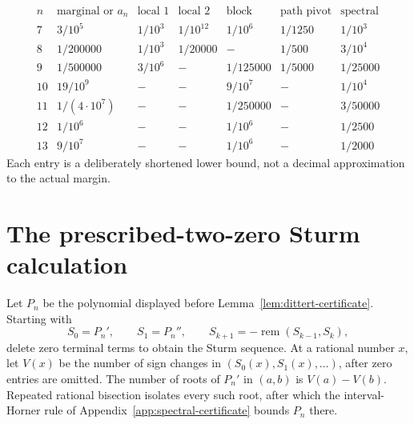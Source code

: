 \documentclass[11pt]{amsart}
\theoremstyle{definition}
\theoremstyle{remark}
\newenvironment{exacttable}
  {\begingroup\small
   \setlength{\arraycolsep}{4pt}%
   \renewcommand{\arraystretch}{1.12}}
  {\endgroup}
\begin{document}
\begin{exacttable}
\[
\begin{array}{c|c|c|c|c|c|c}
n&\text{marginal or }a_n&\text{local 1}&\text{local 2}
 &\text{block}&\text{path pivot}&\text{spectral}\\ \hline
7&3/10^5&1/10^3&1/10^{12}&1/10^6&1/1250&1/10^3\\
8&1/200000&1/10^3&1/20000&-&1/500&3/10^4\\
9&1/500000&3/10^6&-&1/125000&1/5000&1/25000\\
10&19/10^9&-&-&9/10^7&-&1/10^4\\
11&1/(4\cdot10^7)&-&-&1/250000&-&3/50000\\
12&1/10^6&-&-&1/10^6&-&1/2500\\
13&9/10^7&-&-&1/10^6&-&1/2000
\end{array}
\tag{A.1}
\]
\end{exacttable}
Each entry is a deliberately shortened lower bound, not a decimal
approximation to the actual margin.

\section{The prescribed-two-zero Sturm calculation}
\label{app:sturm-certificate}

Let \(P_n\) be the polynomial displayed before
Lemma~\ref{lem:dittert-certificate}.  Starting with
\[
 S_0=P_n',\qquad S_1=P_n'',\qquad
 S_{k+1}=-\operatorname{rem}(S_{k-1},S_k),
\]
delete zero terminal terms to obtain the Sturm sequence.  At a rational
number \(x\), let \(V(x)\) be the number of sign changes in
\((S_0(x),S_1(x),\ldots)\), after zero entries are omitted.  The number of
roots of \(P_n'\) in \((a,b)\) is \(V(a)-V(b)\).  Repeated rational
bisection isolates every such root, after which the interval-Horner rule
of Appendix~\ref{app:spectral-certificate} bounds \(P_n\) there.
\end{document}
